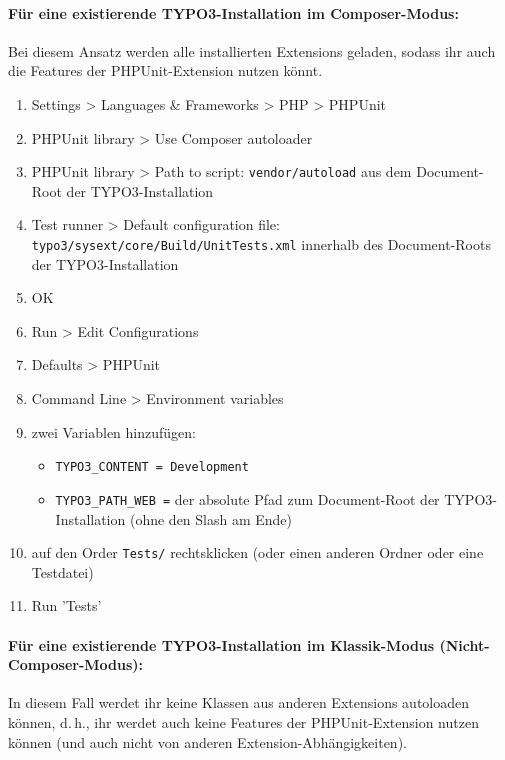 \documentclass[a4paper,11pt,headsepline]{scrartcl}
\begin{document}
\paragraph{Für eine existierende TYPO3-Installation im Composer-Modus:}

Bei diesem Ansatz werden alle installierten Extensions geladen, sodass ihr auch die Features der PHPUnit-Extension nutzen könnt.

\begin{enumerate}
  \item Settings > Languages \& Frameworks > PHP > PHPUnit
  \item PHPUnit library > Use Composer autoloader
  \item PHPUnit library > Path to script: \texttt{vendor/autoload} aus dem Document-Root der TYPO3-Installation
  \item Test runner > Default configuration file: \texttt{typo3/sysext/core/Build/UnitTests.xml} innerhalb des Document-Roots der TYPO3-Installation
  \item OK
  \item Run > Edit Configurations
  \item Defaults > PHPUnit
  \item Command Line > Environment variables
  \item zwei Variablen hinzufügen:
    \begin{itemize}
      \item \texttt{TYPO3\_CONTENT = Development}
      \item \texttt{TYPO3\_PATH\_WEB =} der absolute Pfad zum Document-Root der TYPO3-Installation (ohne den Slash am Ende)
    \end{itemize}
  \item auf den Order \texttt{Tests/} rechtsklicken (oder einen anderen Ordner oder eine Testdatei)
  \item Run 'Tests'
\end{enumerate}


\paragraph{Für eine existierende TYPO3-Installation im Klassik-Modus (Nicht-Composer-Modus):}

In diesem Fall werdet ihr keine Klassen aus anderen Extensions autoloaden können, d.\,h., ihr werdet auch keine Features der PHPUnit-Extension nutzen können (und auch nicht von anderen Extension-Abhängigkeiten).
\end{document}
